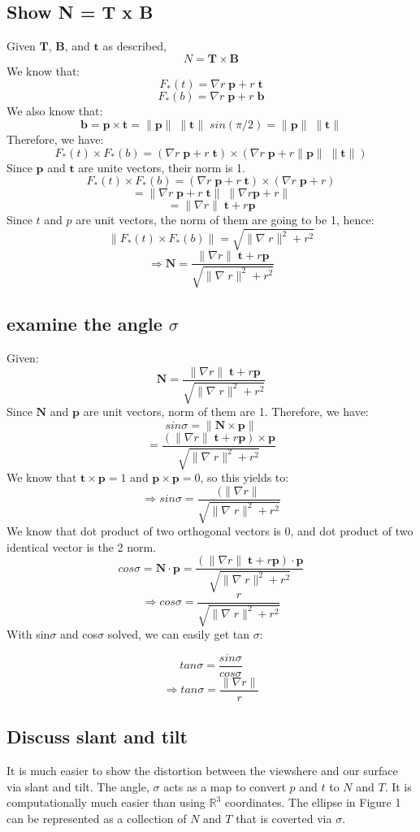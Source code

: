 \documentclass[twoside]{article}
\theoremstyle{definition}
\theoremstyle{definition}
\theoremstyle{remark}
\def\R{{\mathbb R}}
\begin{document}
\subsection{Show N = T x B}
Given $\pmb{T}$, $\pmb{B}$, and $\pmb{t}$ as described, 
\[N = \pmb{T} \times \pmb{B}\]
We know that:
\[F_*(t) = \nabla r \; \pmb{p} + r \; \pmb{t}\]
\[F_*(b) = \nabla r \; \pmb{p} + r \; \pmb{b}\]
We also know that:
\[\pmb{b} = \pmb{p} \times \pmb{t} = \|\pmb{p}\| \; \|\pmb{t}\| \; sin(\pi/2)
 = \|\pmb{p}\| \; \|\pmb{t}\| \]
 Therefore, we have:
 \[F_*(t) \times  F_*(b) = (\nabla r \; \pmb{p} + r \; \pmb{t}) \times (\nabla r \; \pmb{p} + r  \|\pmb{p}\| \; \|\pmb{t}\|)\] 
 Since $\pmb{p}$ and $\pmb{t}$ are unite vectors, their norm is 1. 
 \[F_*(t) \times  F_*(b) = (\nabla r \; \pmb{p} + r \; \pmb{t}) \times (\nabla r \; \pmb{p} + r)\] 
 \[=\|\nabla r \; \pmb{p} + r\; \pmb{t}\| \;\|\nabla r \pmb{p}+r\|\]
 \[=\|\nabla r\| \; \pmb{t} + r \pmb{p}\]
Since $t$ and $p$ are unit vectors, the norm of them are going to be 1, hence:
\[\|F_*(t) \times  F_*(b)\| = \sqrt{\| \nabla \; r\|^2 + r^2}\]
\[\Rightarrow \pmb{N} = \frac{\|\nabla r\| \; \pmb{t} + r \pmb{p}}{\sqrt{\| \nabla \; r\|^2 + r^2}}\]

\subsection{examine the angle $\sigma$}
Given:
\[\pmb{N} = \frac{\|\nabla r\| \; \pmb{t} + r \pmb{p}}{\sqrt{\| \nabla \; r\|^2 + r^2}}\]
Since $\pmb{N}$ and $\pmb{p}$ are unit vectors, norm of them are 1. Therefore, we have:
\[sin\sigma = \|\pmb{N} \times \pmb{p}\|\]
\[= \frac{(\|\nabla r\| \; \pmb{t} + r \pmb{p}) \times \pmb{p}}{\sqrt{\| \nabla \; r\|^2 + r^2}}\]
We know that $\pmb{t} \times \pmb{p} = 1$ and $ \pmb{p} \times \pmb{p} = 0$, so 
this yields to:
\[\Rightarrow sin\sigma = \frac{(\|\nabla r\| }{\sqrt{\| \nabla \; r\|^2 + r^2}}\]
We know that dot product of two orthogonal vectors is 0, and dot product of two identical vector is the 2 norm.\\ 
\[ cos \sigma = \pmb{N} \cdot \pmb{p} = \frac{(\|\nabla r\| \; \pmb{t} + r \pmb{p}) \cdot \pmb{p}}{\sqrt{\| \nabla \; r\|^2 + r^2}}\]
\[\Rightarrow cos \sigma = \frac{r}{\sqrt{\| \nabla \; r\|^2 + r^2}}\]
With sin$\sigma$ and cos$\sigma$ solved, we can easily get tan $\sigma$:

\[tan \sigma = \frac{sin \sigma}{cos \sigma}\]
\[\Rightarrow tan \sigma = \frac{\| \nabla r\|}{r}\]

\subsection{Discuss slant and tilt}
It is much easier to show the distortion between the viewshere and our surface via slant and tilt. The angle, $\sigma$ acts as a map to convert $p$ and $t$ to $N$ and $T$. It is computationally much easier than using $\R^3$ coordinates.
The ellipse in Figure 1 can be represented as a collection of $N$ and $T$ that is coverted via $\sigma$.
\end{document}
